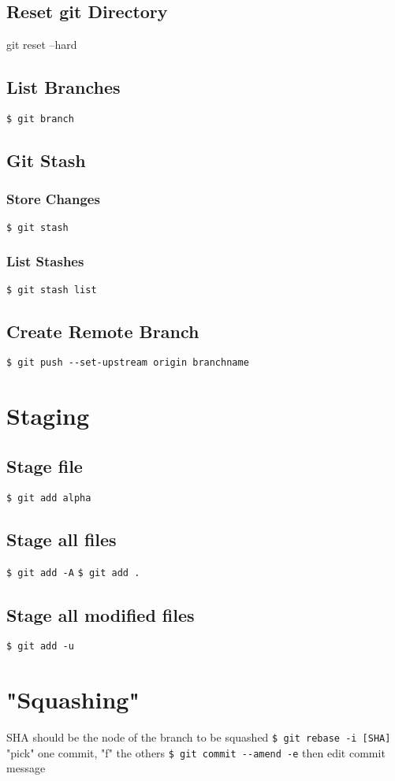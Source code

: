 \documentclass{article}
\begin{document}
\begin{multicols}{3}
\subsection{Reset git Directory}
git reset --hard

\subsection{List Branches}
\lstinline|$ git branch|

\subsection{Git Stash}
\subsubsection{Store Changes}
\lstinline|$ git stash|

\subsubsection{List Stashes}
\lstinline|$ git stash list|

\subsection{Create Remote Branch}
\lstinline|$ git push --set-upstream origin branchname|

\section{Staging}
\subsection{Stage file}
\lstinline|$ git add alpha|

\subsection{Stage all files}
\lstinline|$ git add -A|
\lstinline|$ git add .|

\subsection{Stage all modified files}
\lstinline|$ git add -u|

\section{"Squashing"}
SHA should be the node of the branch to be squashed
\lstinline|$ git rebase -i [SHA]|
"pick" one commit, "f" the others
\lstinline|$ git commit --amend -e|
then edit commit message
\end{multicols}
\end{document}
